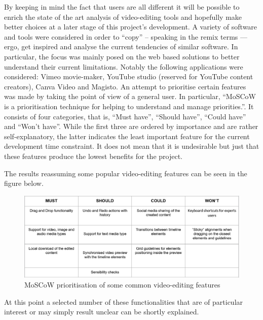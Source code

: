 By keeping in mind the fact that users are all different it will be possible to enrich the state of the art analysis of video-editing tools and hopefully make better choices at a later stage of this project’s development.
A variety of software and tools were considered in order to “copy” – speaking in the remix terms — ergo, get inspired and analyse the current tendencies of similar software.
In particular, the focus was mainly posed on the web based solutions to better understand their current limitations. Notably the following applications were considered: Vimeo movie-maker, YouTube studio (reserved for YouTube content creators), Canva Video and Magisto.
An attempt to prioritise certain features was made by taking the point of view of a general user. In particular, “MoSCoW is a prioritisation technique for helping to understand and manage priorities.”. It consists of four categories, that is, “Must have”, “Should have”, “Could have” and “Won’t have”. While the first three are ordered by importance and are rather self-explanatory, the latter indicates the least important feature for the current development time constraint. It does not mean that it is undesirable but just that these features produce the lowest benefits for the project.

The results reassuming some popular video-editing features can be seen in the figure below.

\begin{figure}[H]
\centering
\includegraphics[width=1\textwidth]{images/moscow.PNG}
\caption{MoSCoW prioritisation of some common video-editing features}
\label{fig:moscow}
\end{figure}

At this point a selected number of these functionalities that are of particular interest or may simply result unclear can be shortly explained.

